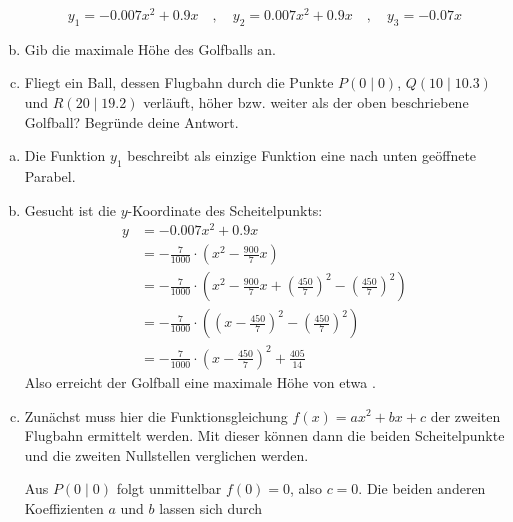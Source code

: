 \begin{exercise}
\begin{enumerate}[a)]
            \begin{equation*}
                y_1=\num{-0.007}x^2+\num{0.9}x
                \quad,\quad
                y_2=\num{0.007}x^2+\num{0.9}x
                \quad,\quad
                y_3=\num{-0.07}x
            \end{equation*}
      \item Gib die maximale Höhe des Golfballs an.
      \item Fliegt ein Ball, dessen Flugbahn durch die Punkte
            $P(0\mid0)$, $Q(10\mid\num{10.3})$ und $R(20\mid\num{19.2})$
            verläuft, höher bzw. weiter als der oben beschriebene Golfball?
            Begründe deine Antwort.
    \end{enumerate}
  \fi
  \ifoutcome\outcome\par
    \begin{enumerate}[a)]
      \item Die Funktion $y_1$ beschreibt als einzige Funktion eine nach
            unten geöffnete Parabel.
      \item Gesucht ist die $y$-Koordinate des Scheitelpunkts:
        \begin{equation*}
          \begin{split}
            y&=\num{-0.007}x^2+\num{0.9}x\\
             &=-\frac{7}{1000}\cdot\left(x^2-\frac{900}{7}x\right)\\
             &=-\frac{7}{1000}\cdot\left(x^2-\frac{900}{7}x+\left(\frac{450}{7}\right)^2-\left(\frac{450}{7}\right)^2\right)\\
             &=-\frac{7}{1000}\cdot\left(\left(x-\frac{450}{7}\right)^2-\left(\frac{450}{7}\right)^2\right)\\
             &=-\frac{7}{1000}\cdot\left(x-\frac{450}{7}\right)^2+\frac{405}{14}
          \end{split}
        \end{equation*}
        Also erreicht der Golfball eine maximale Höhe von etwa .
      \item Zunächst muss hier die Funktionsgleichung $f(x)=ax^2+bx+c$ der zweiten Flugbahn
            ermittelt werden. Mit dieser können dann die beiden Scheitelpunkte
            und die zweiten Nullstellen verglichen werden.\par
            Aus $P(0\mid0)$ folgt unmittelbar $f(0)=0$, also $c=0$.
            Die beiden anderen Koeffizienten $a$ und $b$ lassen sich durch

\end{enumerate}
\end{exercise}
